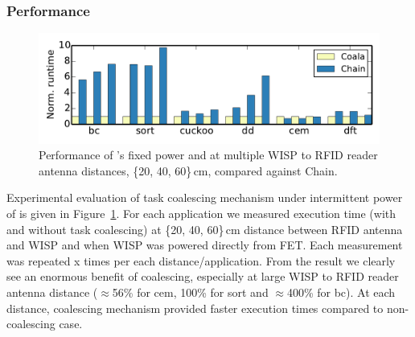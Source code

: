 \subsubsection{\sys Performance}
\label{sec:result_coalescing}

\begin{figure}
	\centering
	\includegraphics[width=\columnwidth]{figures/coala_chain}
	\caption{Performance of \sys's fixed power and at multiple WISP to RFID reader antenna distances, \{20, 40, 60\}\,cm, compared against Chain.}
	\label{fig:coalescing}
\end{figure}

Experimental evaluation of task coalescing mechanism under intermittent power of \sys is given in Figure~\ref{fig:coalescing}. For each application we measured execution time (with and without task coalescing) at \{20, 40, 60\}\,cm distance between RFID antenna and WISP and when WISP was powered directly from FET. Each measurement was repeated x times per each distance/application. From the result we clearly see an enormous benefit of coalescing, especially at large WISP to RFID reader antenna distance ($\approx$56\% for cem, 100\% for sort and $\approx$400\% for bc). At each distance, \sys coalescing mechanism provided faster execution times compared to non-coalescing case. 


